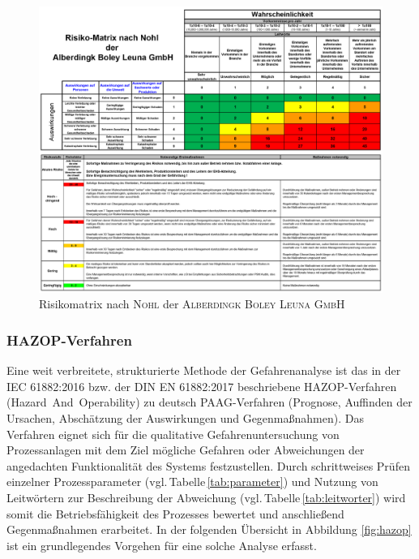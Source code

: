 \begin{figure}[h!]
	\centering
	\includegraphics[width=1.0\textwidth]{img/Risikomatrix}
	\caption{Risikomatrix nach \textsc{Nohl} der \textsc{Alberdingk Boley Leuna GmbH}}
	\label{fig:risikomatrix}
\end{figure}
\FloatBarrier


\subsubsection{HAZOP-Verfahren}
Eine weit verbreitete, strukturierte Methode der Gefahrenanalyse ist das in der IEC 61882:2016 bzw. der DIN EN 61882:2017 beschriebene HAZOP-Verfahren \mbox{(Hazard And Operability)} zu deutsch PAAG-Verfahren (Prognose, Auffinden der Ursachen, Abschätzung der Auswirkungen und Gegenmaßnahmen). Das Verfahren eignet sich für die qualitative Gefahrenuntersuchung von Prozessanlagen mit dem Ziel mögliche Gefahren oder Abweichungen der angedachten Funktionalität des Systems festzustellen.  Durch schrittweises Prüfen einzelner Prozessparameter (vgl.\,Tabelle\,\ref{tab:parameter}) und Nutzung von Leitwörtern zur Beschreibung der Abweichung (vgl.\,Tabelle\,\ref{tab:leitworter}) wird somit die Betriebsfähigkeit des Prozesses bewertet und anschließend Gegenmaßnahmen erarbeitet. \cite{Hauptmanns.2020, UlfSchubert.2020, KenPatterson.2017} \linebreak 
In der folgenden Übersicht in Abbildung \ref{fig:hazop} ist ein grundlegendes Vorgehen für eine solche Analyse erfasst.

